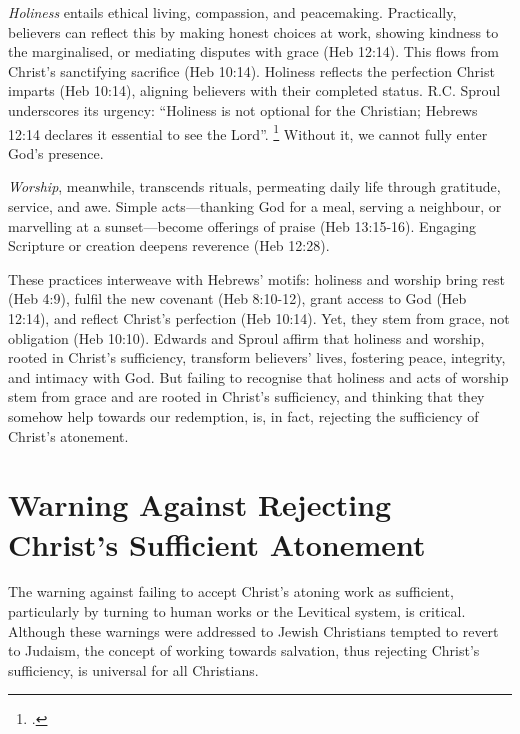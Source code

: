 \documentclass[12pt]{article}
\def\christ{the Messiah}
\def\Christ{The Messiah}
\def\christ{Christ}
\def\Christ{Christ}
\begin{document}
\emph{Holiness} entails ethical living, compassion, and peacemaking.
%
Practically, believers can reflect this by making honest choices at work,
showing kindness to the marginalised, or mediating disputes with grace (Heb
12:14).
%
This flows from \christ{}’s sanctifying sacrifice (Heb 10:14).
%
Holiness reflects the perfection \christ{} imparts (Heb 10:14), aligning
believers with their completed status.
%
R.C. Sproul underscores its urgency: ``Holiness is not optional for the
Christian; Hebrews 12:14 declares it essential to see the Lord''.
\footcite[112]{Sproul1985}
%
Without it, we cannot fully enter God’s presence.

\emph{Worship}, meanwhile, transcends rituals, permeating daily life through
gratitude, service, and awe.
%
Simple acts---thanking God for a meal, serving a neighbour, or marvelling at a
sunset---become offerings of praise (Heb 13:15-16).
%
Engaging Scripture or creation deepens reverence (Heb 12:28).

These practices interweave with Hebrews’ motifs: holiness and worship bring rest
(Heb 4:9), fulfil the new covenant (Heb 8:10-12), grant access to God
(Heb 12:14), and reflect \christ{}’s perfection (Heb 10:14).
%
Yet, they stem from grace, not obligation (Heb 10:10).
%
Edwards and Sproul affirm that holiness and worship, rooted in \christ{}’s
sufficiency, transform believers’ lives, fostering peace, integrity, and
intimacy with God.
%
But failing to recognise that holiness and acts of worship stem from grace and
are rooted in \christ{}’s sufficiency, and thinking that they somehow help
towards our redemption, is, in fact, rejecting the sufficiency of \christ{}'s
atonement.

\section{Warning Against Rejecting \Christ{}’s Sufficient Atonement}
The warning against failing to accept \christ{}’s atoning work as sufficient,
particularly by turning to human works or the Levitical system, is critical.
%
Although these warnings were addressed to Jewish Christians tempted to revert to
Judaism, the concept of working towards salvation, thus rejecting \christ{}’s
sufficiency, is universal for all Christians.
\end{document}
